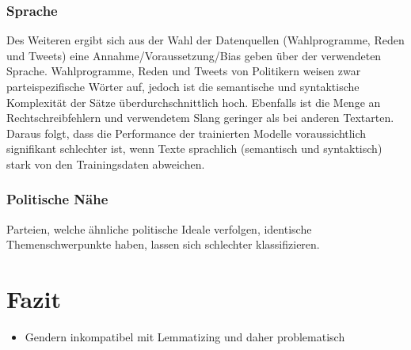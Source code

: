 \subsubsection{Sprache}


Des Weiteren ergibt sich aus der Wahl der Datenquellen (Wahlprogramme, Reden und Tweets) eine Annahme/Voraussetzung/Bias geben über der verwendeten Sprache. Wahlprogramme, Reden und Tweets von Politikern weisen zwar parteispezifische Wörter auf, jedoch ist die semantische und syntaktische Komplexität der Sätze überdurchschnittlich hoch. Ebenfalls ist die Menge an Rechtschreibfehlern und verwendetem Slang geringer als bei anderen Textarten. Daraus folgt, dass die Performance der trainierten Modelle voraussichtlich signifikant schlechter ist, wenn Texte sprachlich (semantisch und syntaktisch) stark von den Trainingsdaten abweichen.

\subsubsection{Politische Nähe}


Parteien, welche ähnliche politische Ideale verfolgen, identische Themenschwerpunkte haben, lassen sich schlechter klassifizieren.

\section{Fazit} \label{sec:crispConclusion}

\begin{itemize}
    \item Gendern inkompatibel mit Lemmatizing und daher problematisch
\end{itemize}
